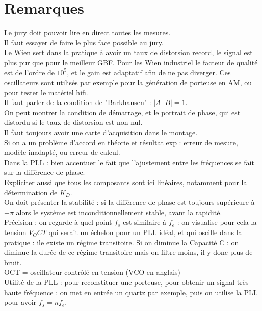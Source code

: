 \documentclass[12pt,prb,aps,epsf]{report}
\begin{document}
\section*{Remarques}
Le jury doit pouvoir lire en direct toutes les mesures.\\
Il faut essayer de faire le plus face possible au jury.\\
Le Wien sert dans la pratique à avoir un taux de distorsion record, le signal est plus pur que pour le meilleur GBF. Pour les Wien industriel le facteur de qualité est de l'ordre de $10^5$, et le gain est adaptatif afin de ne pas diverger. Ces oscillateurs sont utilisés par exemple pour la génération de porteuse en AM, ou pour tester le matériel hifi.\\
Il faut parler de la condition de "Barkhausen" : $|A||B|=1$.\\
On peut montrer la condition de démarrage, et le portrait de phase, qui est distordu si le taux de distorsion est non nul.\\
Il faut toujours avoir une carte d'acquisition dans le montage.\\
Si on a un problème d'accord en théorie et résultat exp : erreur de mesure, modèle inadapté, ou erreur de calcul.\\
Dans la PLL : bien accentuer le fait que l'ajustement entre les fréquences se fait sur la différence de phase.\\
Expliciter aussi que tous les composants sont ici linéaires, notamment pour la détermination de $K_D$.\\
On doit présenter la stabilité : si la différence de phase est toujours supérieure à $-\pi$ alors le système est inconditionnellement stable, avant la rapidité.\\
Précision : on regarde à quel point $f_s$ est similaire à $f_e$ : on visualise pour cela la tension $V_OCT$ qui serait un échelon pour un PLL idéal, et qui oscille dans la pratique : ile existe un régime transitoire. Si on diminue la Capacité C : on diminue la durée de ce régime transitoire mais on filtre moins, il y donc plus de bruit. \\
OCT = oscillateur contrôlé en tension (VCO en anglais)\\
Utilité de la PLL : pour reconstituer une porteuse, pour obtenir un signal très haute fréquence : on met en entrée un quartz par exemple, puis on utilise la PLL pour avoir $f_s = nf_e$. 
	
\end{document}
